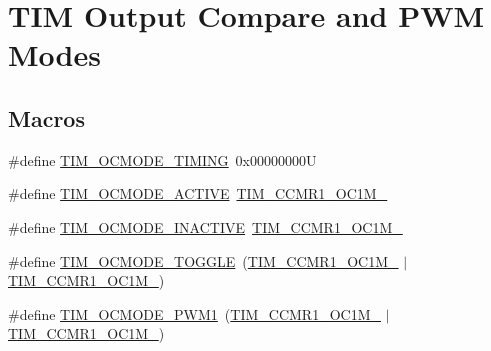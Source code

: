 \hypertarget{group___t_i_m___output___compare__and___p_w_m__modes}{}\section{T\+IM Output Compare and P\+WM Modes}
\label{group___t_i_m___output___compare__and___p_w_m__modes}
\subsection*{Macros}
\begin{DoxyCompactItemize}
\item 
\#define \hyperlink{group___t_i_m___output___compare__and___p_w_m__modes_gafae6b98b4b854fbfffd9a5ebc59c8f61}{T\+I\+M\+\_\+\+O\+C\+M\+O\+D\+E\+\_\+\+T\+I\+M\+I\+NG}~0x00000000U
\item 
\#define \hyperlink{group___t_i_m___output___compare__and___p_w_m__modes_ga111d1023e3ac6ef5544775c3863b4b12}{T\+I\+M\+\_\+\+O\+C\+M\+O\+D\+E\+\_\+\+A\+C\+T\+I\+VE}~\hyperlink{group___peripheral___registers___bits___definition_ga410a4752a98081bad8ab3f72b28e7c5f}{T\+I\+M\+\_\+\+C\+C\+M\+R1\+\_\+\+O\+C1\+M\+\_}
\item 
\#define \hyperlink{group___t_i_m___output___compare__and___p_w_m__modes_ga890fbb44fd16f2bce962983352d23f53}{T\+I\+M\+\_\+\+O\+C\+M\+O\+D\+E\+\_\+\+I\+N\+A\+C\+T\+I\+VE}~\hyperlink{group___peripheral___registers___bits___definition_ga8b5f6ec25063483641d6dc065d96d2b5}{T\+I\+M\+\_\+\+C\+C\+M\+R1\+\_\+\+O\+C1\+M\+\_}
\item 
\#define \hyperlink{group___t_i_m___output___compare__and___p_w_m__modes_ga368f80fad76018e2bf76084522e47536}{T\+I\+M\+\_\+\+O\+C\+M\+O\+D\+E\+\_\+\+T\+O\+G\+G\+LE}~(\hyperlink{group___peripheral___registers___bits___definition_ga8b5f6ec25063483641d6dc065d96d2b5}{T\+I\+M\+\_\+\+C\+C\+M\+R1\+\_\+\+O\+C1\+M\+\_} $\vert$ \hyperlink{group___peripheral___registers___bits___definition_ga410a4752a98081bad8ab3f72b28e7c5f}{T\+I\+M\+\_\+\+C\+C\+M\+R1\+\_\+\+O\+C1\+M\+\_})
\item 
\#define \hyperlink{group___t_i_m___output___compare__and___p_w_m__modes_ga766271da571888dfecd9130c3887e9c6}{T\+I\+M\+\_\+\+O\+C\+M\+O\+D\+E\+\_\+\+P\+W\+M1}~(\hyperlink{group___peripheral___registers___bits___definition_gac024f6b9972b940925ab5786ee38701b}{T\+I\+M\+\_\+\+C\+C\+M\+R1\+\_\+\+O\+C1\+M\+\_} $\vert$ \hyperlink{group___peripheral___registers___bits___definition_ga8b5f6ec25063483641d6dc065d96d2b5}{T\+I\+M\+\_\+\+C\+C\+M\+R1\+\_\+\+O\+C1\+M\+\_})

\end{DoxyCompactItemize}

